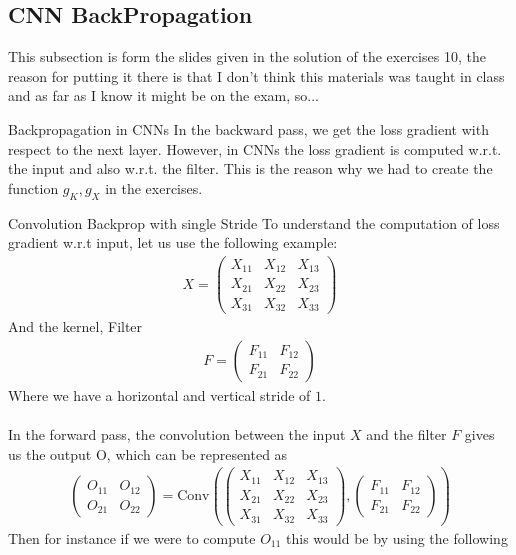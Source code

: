 \subsection{CNN BackPropagation}
This subsection is form the slides given in the solution of the exercises 10, the reason for putting it there is that I don't think this materials was taught in class and as far as I know it might be on the exam, so...

\begin{parag}{Backpropagation in CNNs}
    In the backward pass, we get the loss gradient with respect to the next layer. However, in CNNs the loss gradient is computed w.r.t. the input and also w.r.t. the filter. This is the reason why we had to create the function $g_K, g_X$ in the exercises.
\end{parag}
\begin{parag}{Convolution Backprop with single Stride}
    To understand the computation of loss gradient w.r.t input, let us use the following example: 
	\begin{align*} 
		X = \begin{pmatrix} X_{11} & X_{12} & X_{13} \\ X_{21} & X_{22} & X_{23} \\ X_{31} & X_{32} & X_{33} \end{pmatrix} 
	\end{align*}
	And the kernel, Filter 
	\begin{align*} 
		F = \begin{pmatrix} F_{11} & F_{12} \\ F_{21} & F_{22} \end{pmatrix} 
	\end{align*}
	Where we have a horizontal and vertical stride of $1$.\\
	$ $\\
	In the forward pass, the convolution between the input $X$ and the filter $F$ gives us the output O, which can be represented as 
	\begin{align*} 
		\begin{pmatrix} O_{11} & O_{12} \\ O_{21} & O_{22} \end{pmatrix} = \text{Conv}\left(\begin{pmatrix} X_{11} & X_{12} & X_{13} \\ X_{21} & X_{22} & X_{23} \\ X_{31} & X_{32} & X_{33} \end{pmatrix}, \begin{pmatrix} F_{11} & F_{12} \\ F_{21} & F_{22} \end{pmatrix}\right)
	\end{align*}
	Then for instance if we were to compute $O_{11}$ this would be by using  the following
\end{parag}

